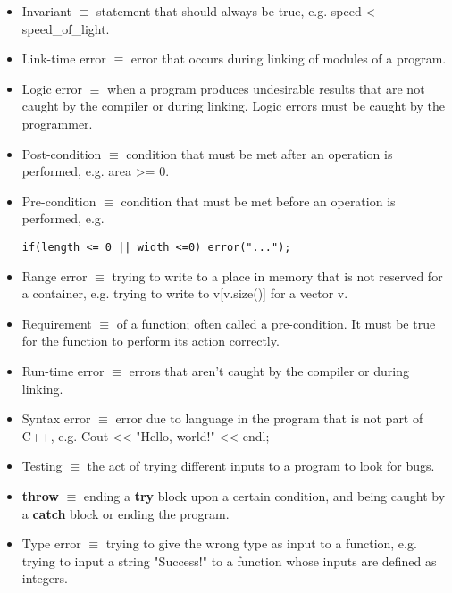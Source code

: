 \documentclass[12pt]{article}
\begin{document}
\begin{itemize}
\item Invariant $\equiv$ statement that should always be true, e.g. speed < speed\_of\_light.

\item Link-time error $\equiv$ error that occurs during linking of modules of a program.

\item Logic error $\equiv$ when a program produces undesirable results that are not caught by the compiler or during linking. Logic errors must be caught by the programmer.

\item Post-condition $\equiv$ condition that must be met after an operation is performed, e.g. area >= 0.

\item Pre-condition $\equiv$ condition that must be met before an operation is performed, e.g.

\begin{lstlisting}
if(length <= 0 || width <=0) error("...");
\end{lstlisting}

\item Range error $\equiv$ trying to write to a place in memory that is not reserved for a container, e.g. trying to write to v[v.size()] for a vector v.

\item Requirement $\equiv$ of a function; often called a pre-condition. It must be true for the function to perform its action correctly.

\item Run-time error $\equiv$ errors that aren't caught by the compiler or during linking.

\item Syntax error $\equiv$ error due to language in the program that is not part of C++, e.g. Cout << "Hello, world!" << endl;

\item Testing $\equiv$ the act of trying different inputs to a program to look for bugs.

\item \textbf{throw} $\equiv$ ending a \textbf{try} block upon a certain condition, and being caught by a \textbf{catch} block or ending the program.

\item Type error $\equiv$ trying to give the wrong type as input to a function, e.g. trying to input a string "Success!" to a function whose inputs are defined as integers.



\end{itemize}
\end{document}
